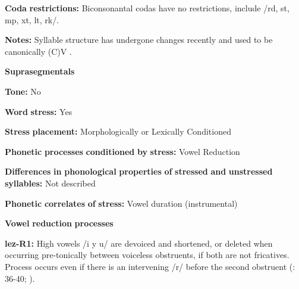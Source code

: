 \documentclass[output=paper]{langsci/langscibook}
\begin{document}
\begin{styleBody}
\textbf{Coda} \textbf{restrictions:} Biconsonantal codas have no restrictions, include /rd, st, mp, xt, lt, rk/.
\end{styleBody}

\begin{styleBody}
\textbf{Notes:} Syllable structure has undergone changes recently and used to be canonically (C)V \citep[46]{Haspelmath1993}.
\end{styleBody}

\begin{styleBody}
\textbf{Suprasegmentals}
\end{styleBody}

\begin{styleBody}
\textbf{Tone:} No
\end{styleBody}

\begin{styleBody}
\textbf{Word} \textbf{stress:} Yes
\end{styleBody}

\begin{styleBody}
\textbf{Stress} \textbf{placement:} Morphologically or Lexically Conditioned
\end{styleBody}

\begin{styleBody}
\textbf{Phonetic} \textbf{processes} \textbf{conditioned} \textbf{by} \textbf{stress:} Vowel Reduction
\end{styleBody}

\begin{styleBody}
\textbf{Differences} \textbf{in} \textbf{phonological} \textbf{properties} \textbf{of} \textbf{stressed} \textbf{and} \textbf{unstressed} \textbf{syllables:} Not described
\end{styleBody}

\begin{styleBody}
\textbf{Phonetic} \textbf{correlates} \textbf{of} \textbf{stress:} Vowel duration (instrumental)
\end{styleBody}

\begin{styleBody}
\textbf{Vowel} \textbf{reduction} \textbf{processes}
\end{styleBody}

\begin{styleBody}
\textbf{lez-R1:} High vowels /i y u/ are devoiced and shortened, or deleted when occurring pre-tonically between voiceless obstruents, if both are not fricatives. Process occurs even if there is an intervening /r/ before the second obstruent (\citealt{Haspelmath1993}: 36-40; \citealt{ChitoranBabaliyeva2007}).
\end{styleBody}
\end{document}

